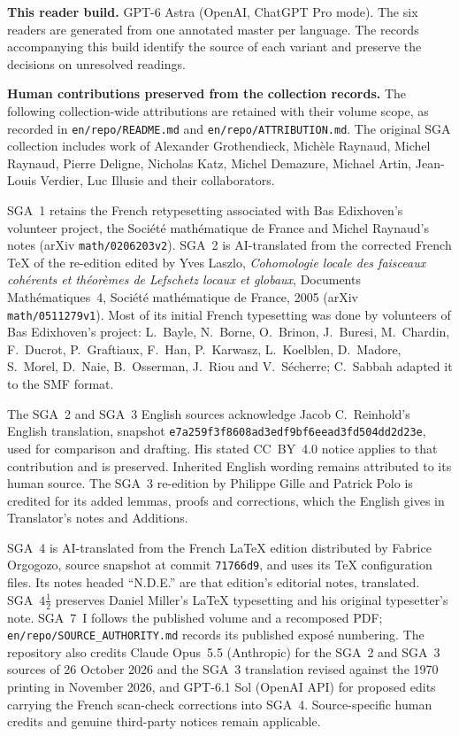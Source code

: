 \noindent\textbf{This reader build.} GPT-6 Astra (OpenAI, ChatGPT Pro mode). The six readers are generated from one annotated master per language. The records accompanying this build identify the source of each variant and preserve the decisions on unresolved readings.

\noindent\textbf{Human contributions preserved from the collection records.} The following collection-wide attributions are retained with their volume scope, as recorded in \texttt{en/repo/README.md} and \texttt{en/repo/ATTRIBUTION.md}. The original SGA collection includes work of Alexander Grothendieck, Mich\`ele Raynaud, Michel Raynaud, Pierre Deligne, Nicholas Katz, Michel Demazure, Michael Artin, Jean-Louis Verdier, Luc Illusie and their collaborators.

SGA~1 retains the French retypesetting associated with Bas Edixhoven's volunteer project, the Soci\'et\'e math\'ematique de France and Michel Raynaud's notes (arXiv \texttt{math/0206203v2}). SGA~2 is AI-translated from the corrected French TeX of the re-edition edited by Yves Laszlo, \textit{Cohomologie locale des faisceaux coh\'erents et th\'eor\`emes de Lefschetz locaux et globaux}, Documents Math\'ematiques~4, Soci\'et\'e math\'ematique de France, 2005 (arXiv \texttt{math/0511279v1}). Most of its initial French typesetting was done by volunteers of Bas Edixhoven's project: L.~Bayle, N.~Borne, O.~Brinon, J.~Buresi, M.~Chardin, F.~Ducrot, P.~Graftiaux, F.~Han, P.~Karwasz, L.~Koelblen, D.~Madore, S.~Morel, D.~Naie, B.~Osserman, J.~Riou and V.~S\'echerre; C.~Sabbah adapted it to the SMF format.

The SGA~2 and SGA~3 English sources acknowledge Jacob C.~Reinhold's English translation, snapshot \texttt{e7a259f3f8608ad3edf9bf6eead3fd504dd2d23e}, used for comparison and drafting. His stated CC~BY~4.0 notice applies to that contribution and is preserved. Inherited English wording remains attributed to its human source. The SGA~3 re-edition by Philippe Gille and Patrick Polo is credited for its added lemmas, proofs and corrections, which the English gives in Translator's notes and Additions.

SGA~4 is AI-translated from the French LaTeX edition distributed by Fabrice Orgogozo, source snapshot at commit \texttt{71766d9}, and uses its TeX configuration files. Its notes headed ``N.D.E.'' are that edition's editorial notes, translated. SGA~$4\frac12$ preserves Daniel Miller's LaTeX typesetting and his original typesetter's note. SGA~7~I follows the published volume and a recomposed PDF; \texttt{en/repo/SOURCE\_AUTHORITY.md} records its published expos\'e numbering. The repository also credits Claude Opus~5.5 (Anthropic) for the SGA~2 and SGA~3 sources of 26 October 2026 and the SGA~3 translation revised against the 1970 printing in November 2026, and GPT-6.1 Sol (OpenAI API) for proposed edits carrying the French scan-check corrections into SGA~4. Source-specific human credits and genuine third-party notices remain applicable.

